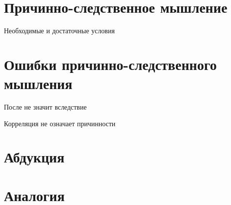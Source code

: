 \documentclass[aspectratio=169]{beamer}
\begin{document}
\section{Причинно-следственное мышление}

\begin{frame}
Необходимые и достаточные условия
\end{frame}

\section{Ошибки причинно-следственного мышления}

\begin{frame}
После не значит вследствие
\end{frame}

\begin{frame}
Корреляция не означает причинности
\end{frame}

\section{Абдукция}

\section{Аналогия}
\end{document}
